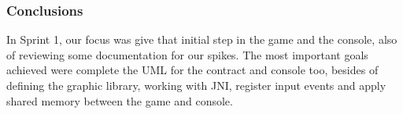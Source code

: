 \subsubsection{Conclusions}

In Sprint 1, our focus was give that initial step in the game and the console, 
also of reviewing some documentation for our spikes. The most important goals
achieved were complete the UML for the contract and console too, besides of 
defining the graphic library, working with JNI, register input events and apply 
shared memory between the game and console.
